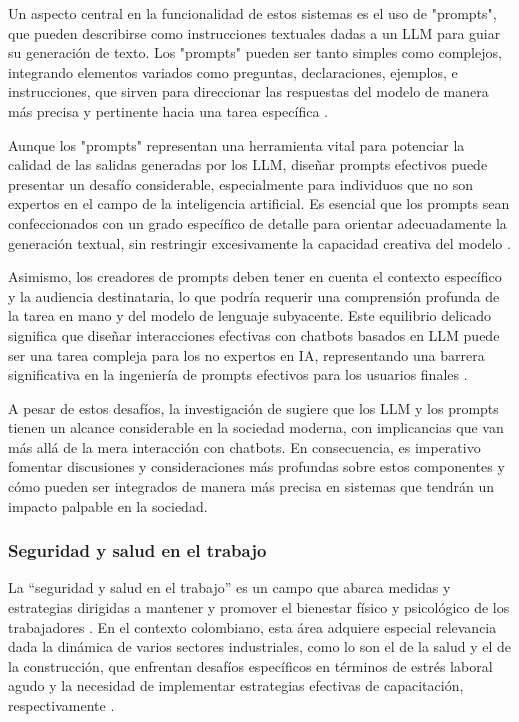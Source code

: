 Un aspecto central en la funcionalidad de estos sistemas es el uso de "prompts", que pueden describirse como instrucciones textuales dadas a un LLM para guiar su generación de texto. Los "prompts" pueden ser tanto simples como complejos, integrando elementos variados como preguntas, declaraciones, ejemplos, e instrucciones, que sirven para direccionar las respuestas del modelo de manera más precisa y pertinente hacia una tarea específica \citep{Zamfirescu-Pereira2023WhyPrompts}.

Aunque los "prompts" representan una herramienta vital para potenciar la calidad de las salidas generadas por los LLM, diseñar prompts efectivos puede presentar un desafío considerable, especialmente para individuos que no son expertos en el campo de la inteligencia artificial. Es esencial que los prompts sean confeccionados con un grado específico de detalle para orientar adecuadamente la generación textual, sin restringir excesivamente la capacidad creativa del modelo \citep{Zamfirescu-Pereira2023WhyPrompts}.

Asimismo, los creadores de prompts deben tener en cuenta el contexto específico y la audiencia destinataria, lo que podría requerir una comprensión profunda de la tarea en mano y del modelo de lenguaje subyacente. Este equilibrio delicado significa que diseñar interacciones efectivas con chatbots basados en LLM puede ser una tarea compleja para los no expertos en IA, representando una barrera significativa en la ingeniería de prompts efectivos para los usuarios finales \citep{Zamfirescu-Pereira2023WhyPrompts}.

 A pesar de estos desafíos, la investigación de \citet{Zamfirescu-Pereira2023WhyPrompts} sugiere que los LLM y los prompts tienen un alcance considerable en la sociedad moderna, con implicancias que van más allá de la mera interacción con chatbots. En consecuencia, es imperativo fomentar discusiones y consideraciones más profundas sobre estos componentes y cómo pueden ser integrados de manera más precisa en sistemas que tendrán un impacto palpable en la sociedad.


\subsubsection{Seguridad y salud en el trabajo}
La ``seguridad y salud en el trabajo'' es un campo que abarca medidas y estrategias dirigidas a mantener y promover el bienestar físico y psicológico de los trabajadores \citep{Yaneth2021StrategiesSector,GonzalezDelgado2023AcuteStudy}. En el contexto colombiano, esta área adquiere especial relevancia dada la dinámica de varios sectores industriales, como lo son el de la salud y el de la construcción, que enfrentan desafíos específicos en términos de estrés laboral agudo y la necesidad de implementar estrategias efectivas de capacitación, respectivamente \citep{Yaneth2021StrategiesSector,GonzalezDelgado2023AcuteStudy}.

